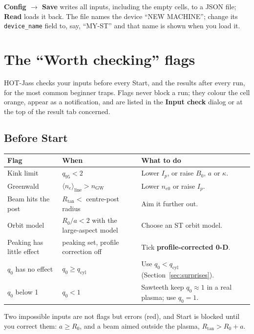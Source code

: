 \documentclass[11pt,a4paper]{article}
\newcommand{\ui}[1]{\textsf{\textbf{#1}}}
\begin{document}
\begin{tip}
\ui{Config $\to$ Save} writes all inputs, including the empty cells, to a JSON
file; \ui{Read} loads it back. The file names the device ``NEW MACHINE'';
change its \texttt{device\_name} field to, say, ``MY-ST'' and that name is shown
when you load it.
\end{tip}

\section{The ``Worth checking'' flags}\label{sec:flags}

HOT-Jass checks your inputs before every Start, and the results after every
run, for the most common beginner traps. Flags never block a run; they colour
the cell orange, appear as a notification, and are listed in the
\ui{Input check} dialog or at the top of the result tab concerned.

\subsection{Before Start}
\begin{center}
\renewcommand{\arraystretch}{1.3}
\begin{tabularx}{\textwidth}{l l X}
\toprule
\textbf{Flag} & \textbf{When} & \textbf{What to do} \\
\midrule
Kink limit & $q_{95}<2$ & Lower $I_p$, or raise $B_0$, $a$ or $\kappa$. \\
Greenwald & $\langle n_e\rangle_{\mathrm{line}} > n_{\mathrm{GW}}$ & Lower $n_{e0}$ or raise $I_p$. \\
Beam hits the post & $R_{\mathrm{tan}} <$ centre-post radius & Aim it further out. \\
Orbit model & $R_0/a<2$ with the large-aspect model & Choose an ST orbit model. \\
Peaking has little effect & peaking set, profile correction off & Tick \ui{profile-corrected 0-D}. \\
$q_0$ has no effect & $q_0 \ge q_{\mathrm{cyl}}$ & Use $q_0 < q_{\mathrm{cyl}}$ (Section~\ref{sec:surprises}). \\
$q_0$ below 1 & $q_0 < 1$ & Sawteeth keep $q_0\approx1$ in a real plasma; use $q_0=1$. \\
\bottomrule
\end{tabularx}
\end{center}
Two impossible inputs are not flags but errors (red), and Start is blocked
until you correct them: $a \ge R_0$, and a beam aimed outside the plasma,
$R_{\mathrm{tan}} > R_0+a$.
\end{document}
